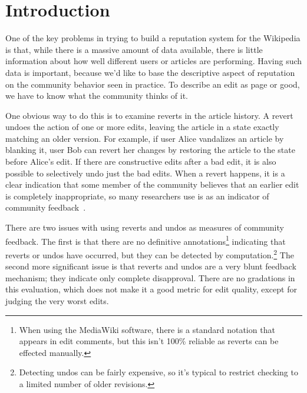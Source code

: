 \section{Introduction}

One of the key problems in trying to build a reputation system
for the Wikipedia is that, while there is a massive amount of
data available, there is little information about how well different
users or articles are performing.
Having such data is important, because we'd like to base the
descriptive aspect of reputation on the community behavior seen
in practice.
To describe an edit as page or good, we have to know what the
community thinks of it.

One obvious way to do this is to examine reverts
in the article history.
A revert undoes the action of one or more edits, leaving
the article in a state exactly matching an older version.
For example, if user Alice vandalizes an article by blanking it,
user Bob can revert her changes by restoring the article to the
state before Alice's edit.
If there are constructive edits after a bad edit, it is also possible
to selectively undo just the bad edits.
When a revert happens, it is a clear indication that some member
of the community believes that an earlier edit is completely
inappropriate, so many researchers use is as an indicator of
community feedback~\cite{Adler2007,Smets2008,Itakura2009,Belani2010}.

There are two issues with using reverts and undos
as measures of community feedback.
The first is that there are no definitive
annotations\footnote{When using the MediaWiki software,
there is a standard notation that appears in edit comments,
but this isn't 100\% reliable as reverts can be effected manually.}
indicating that reverts or undos have occurred,
but they can be detected by
computation.\footnote{Detecting undos can be fairly expensive, so
it's typical to restrict checking to a limited number of older revisions.}
The second more significant issue is that reverts and undos
are a very blunt feedback mechanism; they indicate only complete disapproval.
There are no gradations in this evaluation, which does not make
it a good metric for edit quality, except for judging the very worst
edits.

